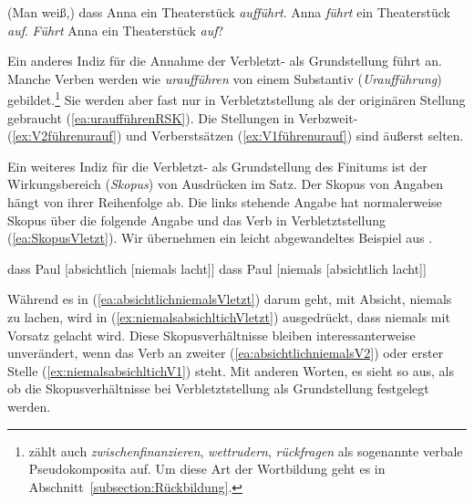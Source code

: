 \ea \label{ea:VptVStellung}
\ea \label{ea:VptVzusammen} (Man weiß,) dass Anna ein Theaterstück \textit{aufführt}.
\ex \label{ex:VptV2getrennt} Anna \textit{führt} ein Theaterstück \textit{auf}.
\ex \label{ex:VptV1getrennt} \textit{Führt} Anna ein Theaterstück \textit{auf}?
\z 
\z 

Ein anderes Indiz für die Annahme der Verbletzt- als Grundstellung führt \citet[370--371]{Hoehle19912018} an. Manche Verben werden wie \textit{uraufführen} von einem Substantiv (\textit{Uraufführung}) gebildet.\footnote{\citet[370]{Hoehle19912018} zählt auch \textit{zwischenfinanzieren}, \textit{wettrudern}, \textit{rückfragen} als sogenannte verbale Pseudokomposita auf. Um diese Art der Wortbildung geht es in Abschnitt~\ref{subsection:Rückbildung}.} Sie werden aber fast nur in Verbletztstellung als der originären Stellung gebraucht (\ref{ea:uraufführenRSK}). Die Stellungen in Verbzweit- (\ref{ex:V2führenurauf}) und Verberstsätzen (\ref{ex:V1führenurauf}) sind äußerst selten. 

\ea \label{ea:uraufführen}
\label{ea:uraufführenRSK}
\label{ex:V2führenurauf} 
\label{ex:V1führenurauf}
\z 
\z 

Ein weiteres Indiz für die Verbletzt- als Grundstellung des Finitums ist der Wirkungsbereich (\textit{Skopus}) von Ausdrücken im Satz. Der Skopus von Angaben hängt von ihrer Reihenfolge ab. Die links stehende Angabe hat normalerweise Skopus über die folgende Angabe und das Verb in Verbletztstellung (\ref{ea:SkopusVletzt}). Wir übernehmen ein leicht abgewandeltes Beispiel aus \citet[77]{Mueller2010}. 

\ea \label{ea:SkopusVletzt}
\ea \label{ea:absichtlichniemalsVletzt} dass Paul [absichtlich [niemals lacht]]
\ex \label{ex:niemalsabsichltichVletzt} dass Paul [niemals [absichtlich lacht]]
\z 
\z 

Während es in (\ref{ea:absichtlichniemalsVletzt}) darum geht, mit Absicht, niemals zu lachen, wird in (\ref{ex:niemalsabsichltichVletzt}) ausgedrückt, dass niemals mit Vorsatz gelacht wird. Diese Skopusverhältnisse bleiben interessanterweise unverändert, wenn das Verb an zweiter (\ref{ea:absichtlichniemalsV2}) oder erster Stelle (\ref{ex:niemalsabsichltichV1}) steht. Mit anderen Worten, es sieht so aus, als ob die Skopusverhältnisse bei Verbletztstellung als Grundstellung festgelegt werden.


